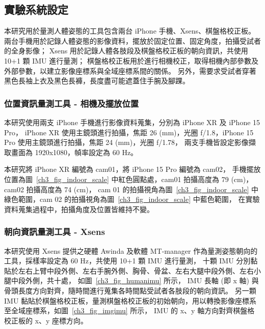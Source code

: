
\subsection{實驗系統設定}
本研究用於量測人體姿態的工具包含兩台 iPhone 手機、Xsens、棋盤格校正板。
兩台手機用於記錄人體姿態的影像資料，擺放於固定位置、固定角度，拍攝受試者的全身影像；
Xsens 用於記錄人體各肢段及棋盤格校正板的朝向資訊，共使用 10+1 顆 IMU 進行量測；
棋盤格校正板用於進行相機校正，取得相機內部參數及外部參數，以建立影像座標系與全域座標系間的關係。
另外，需要求受試者穿著黑色長袖上衣及黑色長褲，長度盡可能遮蓋住手腕及腳踝。


\subsubsection{位置資訊量測工具 - 相機及擺放位置}
本研究使用兩支 iPhone 手機進行影像資料蒐集，分別為 iPhone XR 及 iPhone 15 Pro，
iPhone XR 使用主鏡頭進行拍攝，焦距 26 (mm)，光圈 ƒ/1.8，iPhone 15 Pro 使用主鏡頭進行拍攝，焦距 24 (mm)，光圈 ƒ/1.78，
兩支手機皆設定影像擷取畫面為 1920x1080，幀率設定為 60 Hz。

本研究將 iPhone XR 編號為 cam01，將 iPhone 15 Pro 編號為 cam02，
手機擺放位置為圖~\ref{ch3_fig_indoor_scale} 中紅色圓點處，cam01 拍攝高度為 79 (cm)，cam02 拍攝高度為 74 (cm)，
cam 01 的拍攝視角為圖~\ref{ch3_fig_indoor_scale} 中綠色範圍，cam 02 的拍攝視角為圖~\ref{ch3_fig_indoor_scale} 中藍色範圍，
在實驗資料蒐集過程中，拍攝角度及位置皆維持不變。

\subsubsection{朝向資訊量測工具 - Xsens}
本研究使用 Xsens 提供之硬體 Awinda 及軟體 MT-manager 作為量測姿態朝向的工具，採樣率設定為 60 Hz，共使用 10+1 顆 IMU 進行量測，
十顆 IMU 分別黏貼於左右上臂中段外側、左右手腕外側、胸骨、骨盆、左右大腿中段外側、左右小腿中段外側，共十處，
如圖~\ref{ch3_fig_humanimu} 所示， IMU 長軸 (即 x 軸) 與骨頭長度方向對齊，隨時間進行蒐集各時間點受試者各肢段的朝向資訊。
另一顆 IMU 黏貼於棋盤格校正板，量測棋盤格校正板的初始朝向，用以轉換影像座標系至全域座標系，如圖~\ref{ch3_fig_imgimu} 所示，
IMU 的 x、y 軸方向對齊棋盤格校正板的 x、y 座標方向。

